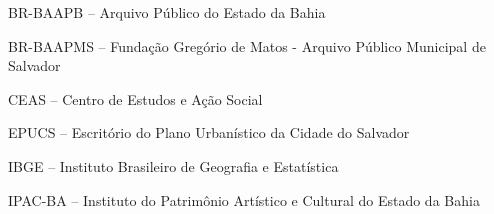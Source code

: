 \begin{siglas}
\item BR-BAAPB -- Arquivo Público do Estado da Bahia
\item BR-BAAPMS -- Fundação Gregório de Matos - Arquivo Público Municipal de Salvador
\item CEAS -- Centro de Estudos e Ação Social
\item EPUCS -- Escritório do Plano Urbanístico da Cidade do Salvador
\item IBGE -- Instituto Brasileiro de Geografia e Estatística
\item IPAC-BA -- Instituto do Patrimônio Artístico e Cultural do Estado da Bahia
\end{siglas}